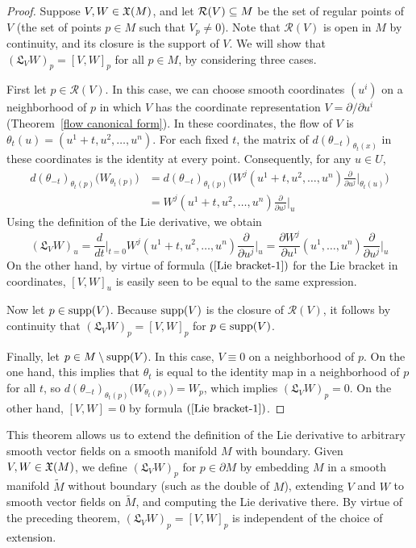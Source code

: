 \begin{proof}
Suppose $V,W\in\mathfrak{X}(M)$, and let $\mathcal{R}(V)\subseteq M$ be the set of regular points of $V$ (the set of points $p\in M$ such that $V_p\neq0$). Note that $\mathcal{R}(V)$ is open in $M$ by continuity, and its closure is the support of $V$. We will show that $(\mathfrak{L}_VW)_p=[V,W]_p$ for all $p\in M$, by considering three cases.\par
First let $p\in\mathcal{R}(V)$. In this case, we can choose smooth coordinates $(u^i)$ on a neighborhood of $p$ in which $V$ has the coordinate representation $V=\partial/\partial u^i$ (Theorem~\ref{flow canonical form}). In these coordinates, the flow of $V$ is $\theta_t(u)=(u^1+t,u^2,\dots,u^n)$. For each fixed $t$, the matrix of $d(\theta_{-t})_{\theta_t(x)}$ in these coordinates is the identity at every point. Consequently, for any $u\in U$,
\begin{align*}
d(\theta_{-t})_{\theta_t(p)}\big(W_{\theta_t(p)}\big)&=d(\theta_{-t})_{\theta_t(p)}\Big(W^j(u^1+t,u^2,\dots,u^n)\frac{\partial}{\partial u^j}\Big|_{\theta_t(u)}\Big)\\
&=W^j(u^1+t,u^2,\dots,u^n)\frac{\partial}{\partial u^j}\Big|_{u}
\end{align*}
Using the definition of the Lie derivative, we obtain
\[(\mathfrak{L}_VW)_u=\frac{d}{dt}\Big|_{t=0}W^j(u^1+t,u^2,\dots,u^n)\frac{\partial}{\partial u^j}\Big|_{u}=\frac{\partial W^j}{\partial u^1}(u^1,\dots,u^n)\frac{\partial}{\partial u^j}\Big|_u\]
On the other hand, by virtue of formula $(\ref{Lie bracket-1})$ for the Lie bracket in coordinates, $[V,W]_u$ is easily seen to be equal to the same expression.\par
Now let $p\in\mathrm{supp}(V)$. Because $\mathrm{supp}(V)$ is the closure of $\mathcal{R}(V)$, it follows by continuity that $(\mathfrak{L}_VW)_p=[V,W]_p$ for $p\in\mathrm{supp}(V)$.\par
Finally, let $p\in M\setminus\mathrm{supp}(V)$. In this case, $V\equiv 0$ on a neighborhood of $p$. On the one hand, this implies that $\theta_t$ is equal to the identity map in a neighborhood of $p$ for all $t$, so $d(\theta_{-t})_{\theta_t(p)}\big(W_{\theta_t(p)}\big)=W_p$, which implies $(\mathfrak{L}_VW)_p=0$. On the other hand, $[V,W]=0$ by formula $(\ref{Lie bracket-1})$.
\end{proof}
This theorem allows us to extend the definition of the Lie derivative to arbitrary
smooth vector fields on a smooth manifold $M$ with boundary. Given $V,W\in\mathfrak{X}(M)$, we define $(\mathfrak{L}_VW)_p$ for $p\in\partial M$ by embedding $M$ in a smooth manifold $\widetilde{M}$ without boundary (such as the double of $M$), extending $V$ and $W$ to smooth vector fields on $\widetilde{M}$, and computing the Lie derivative there. By virtue of the preceding theorem, $(\mathfrak{L}_VW)_p=[V,W]_p$ is independent of the choice of extension.\par
